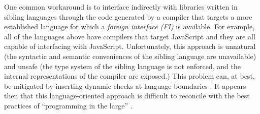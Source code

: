 \documentclass[10pt]{sigplanconf}
\begin{document}
One common workaround is to interface indirectly with libraries written in sibling languages through the code generated by a compiler that targets a more established language for which a \emph{foreign interface (FI)} is available. For example, all of the languages above have compilers that target JavaScript and they are all capable of interfacing with JavaScript. Unfortunately, this approach is unnatural (the syntactic and semantic conveniences of the sibling language are unavailable) and unsafe (the type system of the sibling language is not enforced, and the internal representations of the compiler are exposed.) This problem can, at best, be mitigated by inserting dynamic checks at language boundaries \cite{DBLP:journals/toplas/MatthewsF09}. It appears then that this language-oriented approach \cite{journals/stp/Ward94} is difficult to reconcile with the best practices of ``programming in the large'' \cite{DeRemer76}. 



\end{document}
